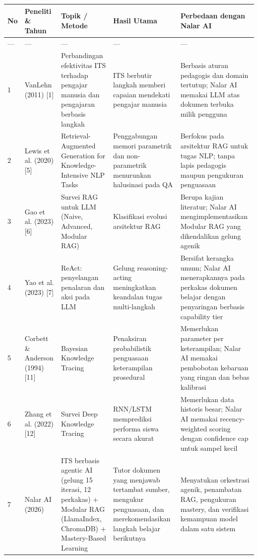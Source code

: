 \documentclass[12pt,a4paper]{article}
\begin{document}
\begin{table}[h]

\centering

\begin{tabular}{lllll}

\toprule

No & Peneliti \& Tahun & Topik / Metode & Hasil Utama & Perbedaan dengan Nalar AI \\

\midrule

--- & --- & --- & --- & --- \\

1 & VanLehn (2011) {[}1{]} & Perbandingan efektivitas ITS terhadap pengajar manusia dan pengajaran berbasis langkah & ITS berbutir langkah memberi capaian mendekati pengajar manusia & Berbasis aturan pedagogis dan domain tertutup; Nalar AI memakai LLM atas dokumen terbuka milik pengguna \\

2 & Lewis et al. (2020) {[}5{]} & Retrieval-Augmented Generation for Knowledge-Intensive NLP Tasks & Penggabungan memori parametrik dan non-parametrik menurunkan halusinasi pada QA & Berfokus pada arsitektur RAG untuk tugas NLP; tanpa lapis pedagogis maupun pengukuran penguasaan \\

3 & Gao et al. (2023) {[}6{]} & Survei RAG untuk LLM (Naive, Advanced, Modular RAG) & Klasifikasi evolusi arsitektur RAG & Berupa kajian literatur; Nalar AI mengimplementasikan Modular RAG yang dikendalikan gelung agenik \\

4 & Yao et al. (2023) {[}7{]} & ReAct: penyelangan penalaran dan aksi pada LLM & Gelung reasoning-acting meningkatkan keandalan tugas multi-langkah & Bersifat kerangka umum; Nalar AI menerapkannya pada perkakas dokumen belajar dengan penyaringan berbasis capability tier \\

5 & Corbett \& Anderson (1994) {[}11{]} & Bayesian Knowledge Tracing & Penaksiran probabilistik penguasaan keterampilan prosedural & Memerlukan parameter per keterampilan; Nalar AI memakai pembobotan kebaruan yang ringan dan bebas kalibrasi \\

6 & Zhang et al. (2022) {[}12{]} & Survei Deep Knowledge Tracing & RNN/LSTM memprediksi performa siswa secara akurat & Memerlukan data historis besar; Nalar AI memakai recency-weighted scoring dengan confidence cap untuk sampel kecil \\

7 & Nalar AI (2026) & ITS berbasis agentic AI (gelung 15 iterasi, 12 perkakas) + Modular RAG (LlamaIndex, ChromaDB) + Mastery-Based Learning & Tutor dokumen yang menjawab tertambat sumber, mengukur penguasaan, dan merekomendasikan langkah belajar berikutnya & Menyatukan orkestrasi agenik, penambatan RAG, pengukuran mastery, dan verifikasi kemampuan model dalam satu sistem \\

\bottomrule

\end{tabular}

\end{table}
\end{document}
